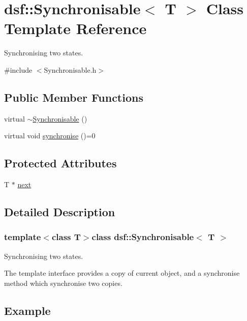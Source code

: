 \hypertarget{classdsf_1_1_synchronisable}{}\section{dsf\+:\+:Synchronisable$<$ T $>$ Class Template Reference}
\label{classdsf_1_1_synchronisable}


Synchronising two states.  




{\ttfamily \#include $<$Synchronisable.\+h$>$}

\subsection*{Public Member Functions}
\begin{DoxyCompactItemize}
\item 
virtual \hyperlink{classdsf_1_1_synchronisable_ae733344b5ac5742826aa4781abdc6e2c}{$\sim$\+Synchronisable} ()
\item 
virtual void \hyperlink{classdsf_1_1_synchronisable_a225f9a5f6cb47d73e1ea4d788bbfcaaa}{synchronise} ()=0
\end{DoxyCompactItemize}
\subsection*{Protected Attributes}
\begin{DoxyCompactItemize}
\item 
T $\ast$ \hyperlink{classdsf_1_1_synchronisable_ae2434faac15d3184da1543a91e175713}{next}
\end{DoxyCompactItemize}


\subsection{Detailed Description}
\subsubsection*{template$<$class T$>$class dsf\+::\+Synchronisable$<$ T $>$}

Synchronising two states. 

The template interface provides a copy of current object, and a synchronise method which synchronise two copies. \hypertarget{classdsf_1_1_synchronized_var_Example}{}\subsection{Example}\label{classdsf_1_1_synchronized_var_Example}

